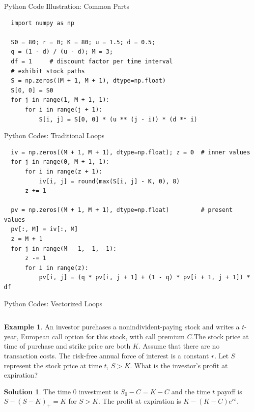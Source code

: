 \documentclass[10pt,handout]{beamer}
\theoremstyle{definition}
\newtheorem*{ex}{Example}
\newtheorem*{sol}{Solution}
\begin{document}
\begin{frame}[fragile]{Python Code Illustration: Common Parts}
  \begin{verbatim}
  import numpy as np
  
  S0 = 80; r = 0; K = 80; u = 1.5; d = 0.5; 
  q = (1 - d) / (u - d); M = 3; 
  df = 1     # discount factor per time interval
  # exhibit stock paths
  S = np.zeros((M + 1, M + 1), dtype=np.float)  
  S[0, 0] = S0
  for j in range(1, M + 1, 1):
      for i in range(j + 1):
          S[i, j] = S[0, 0] * (u ** (j - i)) * (d ** i)
  \end{verbatim}
\end{frame}
  
\begin{frame}[fragile]{Python Codes: Traditional Loops}
  \begin{verbatim}
  iv = np.zeros((M + 1, M + 1), dtype=np.float); z = 0  # inner values
  for j in range(0, M + 1, 1):
      for i in range(z + 1):
          iv[i, j] = round(max(S[i, j] - K, 0), 8)
      z += 1
  
  pv = np.zeros((M + 1, M + 1), dtype=np.float)         # present values
  pv[:, M] = iv[:, M]
  z = M + 1
  for j in range(M - 1, -1, -1):
      z -= 1
      for i in range(z):
          pv[i, j] = (q * pv[i, j + 1] + (1 - q) * pv[i + 1, j + 1]) * df
  \end{verbatim}
\end{frame}

\begin{frame}{Python Codes: Vectorized Loops}
  \inputminted[fontsize=\footnotesize,linenos=true]{python}{fig/note08/binomial_vec.py}
\end{frame}

\begin{frame}
  \begin{ex}
  An investor purchases a nonindivident-paying stock and writes a $t$-year, European call option for this stock, with call premium $C$.The stock price at time of purchase and strike price are both $K$. Assume that there are no transaction costs. The risk-free annual force of interest is a constant $r$. Let $S$ represent the stock price at time $t$, $S > K$. What is the investor's profit at expiration?
  \end{ex}
  \begin{sol}
    The time $0$ investment is $S_0 - C = K - C$ and the time $t$ payoff is $S - (S - K)_+ = K$ for $S > K$. The profit at expiration is $K - (K - C)e^{rt}$.
  \end{sol}
\end{frame}
\end{document}
